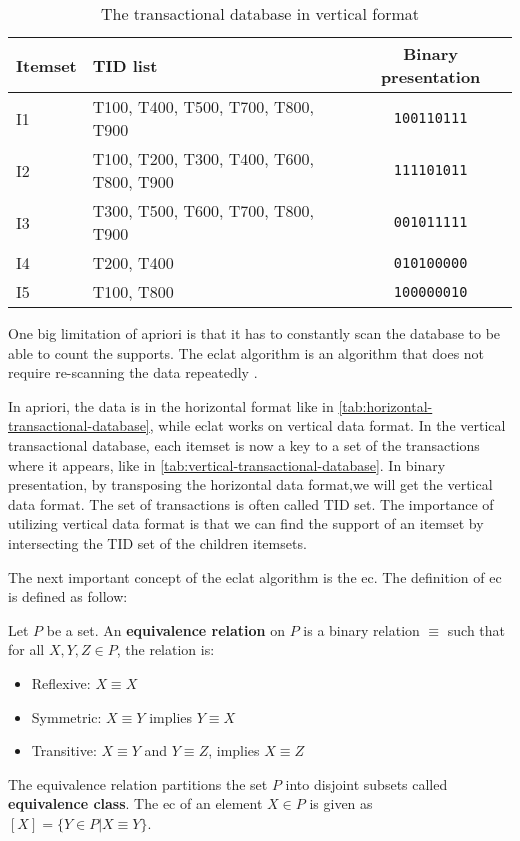 \begin{table}[]
    \centering
    \begin{tabular}{|l|l|c|}
        \hline
        \textbf{Itemset} & \textbf{TID list}                        & \textbf{Binary presentation} \\ \hline
        I1               & T100, T400, T500, T700, T800, T900       & \texttt{100110111}           \\ \hline
        I2               & T100, T200, T300, T400, T600, T800, T900 & \texttt{111101011}           \\ \hline
        I3               & T300, T500, T600, T700, T800, T900       & \texttt{001011111}           \\ \hline
        I4               & T200, T400                               & \texttt{010100000}           \\ \hline
        I5               & T100, T800                               & \texttt{100000010}           \\ \hline
        \end{tabular}
    \caption{The transactional database in vertical format \citep{han2012mining}}
    \label{tab:vertical-transactional-database}
\end{table}

One big limitation of \acl*{apriori} is that it has to constantly scan the database to be able to count the supports.
The \ac{eclat} algorithm is an algorithm that does not require re-scanning the data repeatedly \citep{zaki1997}.

In \acl{apriori}, the data is in the horizontal format like in \autoref{tab:horizontal-transactional-database}, while \ac{eclat} works on vertical data format.
In the vertical transactional database, each itemset is now a key to a set of the transactions where it appears, like in \autoref{tab:vertical-transactional-database}.
In binary presentation, by transposing the horizontal data format,we will get the vertical data format.
The set of transactions is often called \ac{TID} set.
The importance of utilizing vertical data format is that we can find the support of an itemset by intersecting the \ac{TID} set of the children itemsets.

The next important concept of the \ac{eclat} algorithm is the \ac{ec}. The definition of \acl{ec} is defined as follow:

\begin{definition}
    Let $P$ be a set. An \textbf{equivalence relation} on $P$ is a binary relation $\equiv$ such that for all $X, Y, Z \in P$, the relation is:
    \begin{itemize}
        \item Reflexive: $X \equiv X$
        \item Symmetric: $X \equiv Y$ implies $Y \equiv X$
        \item Transitive: $X \equiv Y$ and $Y \equiv Z$, implies $X \equiv Z$
    \end{itemize}
    The equivalence relation partitions the set $P$ into disjoint subsets called \textbf{equivalence class}. The \ac{ec} of an element $X \in P$ is given as $[X] = \{ Y \in P | X \equiv Y \}$.
\end{definition}

